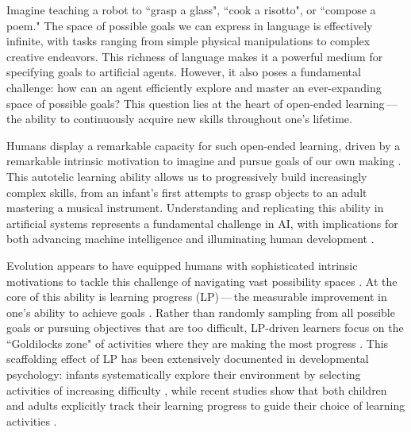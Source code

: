 
Imagine teaching a robot to ``grasp a glass", ``cook a risotto", or ``compose a poem." The space of possible goals we can express in language is effectively infinite, with tasks ranging from simple physical manipulations to complex creative endeavors. This richness of language makes it a powerful medium for specifying goals to artificial agents. However, it also poses a fundamental challenge: how can an agent efficiently explore and master an ever-expanding space of possible goals? This question lies at the heart of open-ended learning\,---\,the ability to continuously acquire new skills throughout one's lifetime.

Humans display a remarkable capacity for such open-ended learning, driven by a remarkable intrinsic motivation to imagine and pursue goals of our own making \citep{colas_autotelic_2022}. This autotelic learning ability allows us to progressively build increasingly complex skills, from an infant's first attempts to grasp objects to an adult mastering a musical instrument. Understanding and replicating this ability in artificial systems represents a fundamental challenge in AI, with implications for both advancing machine intelligence and illuminating human development \citep{schmidhuber_powerplay_2013, jiang2023general, Sigaud2023ADO}. 

Evolution appears to have equipped humans with sophisticated intrinsic motivations to tackle this challenge of navigating vast possibility spaces \citep{oudeyer2016evolution, gottlieb2018towards}. At the core of this ability is learning progress (LP)\,---\,the measurable improvement in one's ability to achieve goals \citep{kaplan2007progress}. Rather than randomly sampling from all possible goals or pursuing objectives that are too difficult, LP-driven learners focus on the ``Goldilocks zone" of activities where they are making the most progress \citep{kidd2015psychology}. This scaffolding effect of LP has been extensively documented in developmental psychology: infants systematically explore their environment by selecting activities of increasing difficulty \citep{oudeyer2016evolution}, while recent studies show that both children and adults explicitly track their learning progress to guide their choice of learning activities \cite{ten_humans_2021,leonard2023young}. 

